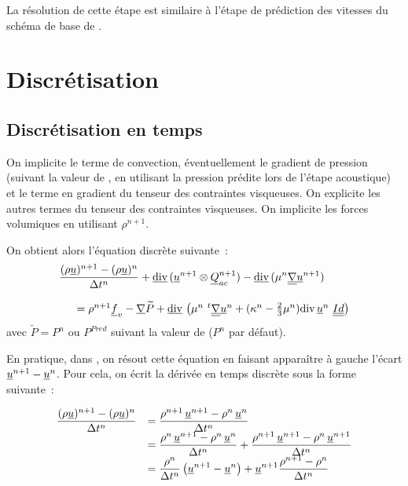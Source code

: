 La r\'esolution de cette \'etape est similaire \`a l'\'etape
de pr\'ediction des vitesses du sch\'ema de base de \CS.

\section*{Discr\'etisation}
\subsection*{Discr\'etisation en temps}

On implicite le terme de convection, éventuellement
le gradient de pression (suivant la valeur de , en utilisant la
pression pr\'edite lors de l'\'etape acoustique) et le terme en gradient
du tenseur des contraintes visqueuses.
On explicite les autres termes du tenseur des contraintes visqueuses.
On implicite les forces
volumiques en utilisant $\rho^{n+1}$.

On obtient alors l'\'equation discr\`ete suivante~:
\begin{equation}\label{Cfbl_Cfqdmv_eq_vitesse_cfqdmv}
\begin{array}{l}
\displaystyle\frac{(\rho\underline{u})^{n+1}-(\rho\underline{u})^n}{\Delta t^n}
+ \underline{\text{div}}\,(\underline{u}^{n+1} \otimes \underline{Q}_{ac}^{n+1})
- \underline{\text{div}}\,(\mu^n \underline{\underline{{\nabla}}}{\underline{u}^{n+1}})\\
\\
\text{\ \ \ \ }= \rho^{n+1} \underline{f}_v - \underline{\nabla}{\widetilde{P}}
+ \underline{\text{div}}\,\left(\mu^n\ ^t\underline{\underline{{\nabla}}}{\underline{u}^n}
+ (\kappa^n-\frac{2}{3}\mu^n)\text{div}\,{\underline{u}^n}\ \underline{\underline{Id}}\right)\\
\end{array}
\end{equation}
avec $\widetilde{P}=P^n\text{ ou }P^{Pred}$ suivant la valeur de 
($P^n$ par défaut).

En pratique, dans \CS, on r\'esout cette \'equation en faisant appara\^itre \`a
gauche l'\'ecart $\underline{u}^{n+1} - \underline{u}^n$. Pour cela, on \'ecrit la
d\'eriv\'ee en temps discr\`ete sous la forme suivante~:

\begin{equation}
\begin{array}{ll}
\displaystyle
\frac{(\rho \underline{u})^{n+1} - (\rho \underline{u})^n}{\Delta t^n}
& =
\displaystyle
\frac{\rho^{n+1}\, \underline{u}^{n+1} - \rho^n\, \underline{u}^n}{\Delta t^n}\\
& =
\displaystyle
\frac{\rho^{n}\, \underline{u}^{n+1} - \rho^n\, \underline{u}^n}{\Delta t^n}+
\frac{\rho^{n+1}\, \underline{u}^{n+1} - \rho^n\, \underline{u}^{n+1}}{\Delta t^n}\\
& =
\displaystyle
\frac{\rho^{n}}{\Delta t^n}\left(\underline{u}^{n+1} - \underline{u}^n\right)+
\underline{u}^{n+1}\frac{\rho^{n+1} - \rho^n}{\Delta t^n}
\end{array}
\end{equation}

